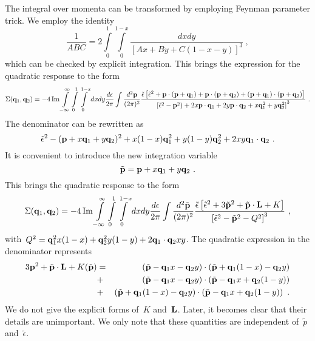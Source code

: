\documentclass[preprint,aps,prb]{revtex4}
\begin{document}
The integral over momenta can be transformed by employing 
Feynman parameter trick. We employ the identity
\begin{equation}
\frac{1}{ABC} = 2\int\limits_{0}^{1} \int\limits_{0}^{1-x}
\frac{dx dy}{\left[Ax + By + C(1 - x - y)\right]^3}
\ , 
\end{equation}
which can be checked by explicit integration. 
This brings the expression for the quadratic response to the form
\begin{equation}
\Sigma({\bf q}_1, {\bf q}_2)
= -4 \mathop{\rm Im}\nolimits \int\limits_{-\infty}^{\infty}
\int\limits_{0}^{1} \int\limits_{0}^{1-x}
dx dy \frac{d\epsilon}{2\pi}
\int\frac{d^2{\bf p}}{(2\pi)^2}
\frac{
  \tilde{\epsilon}
  \left[\tilde{\epsilon}^2 
      + {\bf p}\cdot({\bf p} + {\bf q}_1)
      + {\bf p}\cdot({\bf p} + {\bf q}_2)
      + ({\bf p} + {\bf q}_1)\cdot({\bf p} +  {\bf q}_2)
   \right]
}{
    \left[\tilde{\epsilon}^2 - {\bf p}^2)
			+ 2 x {\bf p} \cdot{\bf q}_1
			+ 2 y {\bf p} \cdot{\bf q}_2
			+ x {\bf q}_1^2  + y {\bf q}_2^2 \right]^3
}
\ .			      
\end{equation}
The denominator can be rewritten as 
\begin{equation}
\tilde{\epsilon}^2 - ({\bf p} + x {\bf q}_1 + y{\bf q}_2)^2 
+ x(1 - x)  {\bf q}_1^2 + y(1 - y) {\bf q}_2^2
+ 2 xy {\bf q}_1 \cdot{\bf q}_2
\ .
\end{equation}
It is convenient to introduce the new integration variable
\begin{equation}
\tilde{\bf p} = {\bf p} +  x {\bf q}_1 + y{\bf q}_2 
\ .
\end{equation}
This brings the quadratic response to the form
\begin{equation}
\label{U2-before-p}
\Sigma({\bf q}_1, {\bf q}_2)
= -4 \mathop{\rm Im}\nolimits \int\limits_{-\infty}^{\infty}
\int\limits_{0}^{1} \int\limits_{0}^{1-x}
dx dy \frac{d\epsilon}{2\pi}
\int\frac{d^2\tilde{\bf p}}{(2\pi)^2}
\frac{
  \tilde{\epsilon}
  \left[\tilde{\epsilon}^2  + 3\tilde{\bf p}^2 + \tilde{\bf
  p}\cdot{\bf L} + K
  \right]
}{
    \left[\tilde{\epsilon}^2 - \tilde{\bf p}^2 - Q^2 \right]^3
}
\ , 			      
\end{equation}
with~$Q^2 = {\bf q}_1^2 x(1 - x) + {\bf q}_2^2 y(1 - y) + 2{\bf q}_1
\cdot {\bf q}_2 xy$. The quadratic expression in the denominator
represents
\begin{eqnarray}
3{\bf p}^2 + \tilde{\bf p}\cdot{\bf L} + K(\tilde{\bf p}) &=& 
\left(\tilde{\bf p} - {\bf q}_1 x - {\bf q}_2 y\right) 
\cdot\left(\tilde{\bf p} + {\bf q}_1 (1 - x) - {\bf q}_2 y\right)
\nonumber
\\
&+& 
\left(\tilde{\bf p} - {\bf q}_1 x - {\bf q}_2 y\right)
\cdot\left(\tilde{\bf p} - {\bf q}_1 x + {\bf q}_2 (1 - y)\right)
\\
&+&
\left(\tilde{\bf p} + {\bf q}_1 (1 - x) - {\bf q}_2 y\right)
\cdot\left(\tilde{\bf p} - {\bf q}_1 x + {\bf q}_2 (1 - y)\right)
\nonumber
\ .
\end{eqnarray}
We do not give the explicit forms of~$K$ and~${\bf L}$. Later, it
becomes clear that their details are unimportant. We only note
that these quantities are independent of~$\tilde{p}$
and~$\tilde{\epsilon}$.
\end{document}
